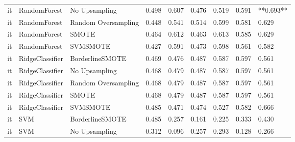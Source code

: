 \begin{tabular}{lllllllll}
      it &                 RandomForest &       No Upsampling & 0.498 &                     0.607 &                 0.476 &                  0.519 &                                   0.591 & **0.693** \\
      it &                 RandomForest & Random Oversampling & 0.448 &                     0.541 &                 0.514 &                  0.599 &                                   0.581 &     0.629 \\
      it &                 RandomForest &               SMOTE & 0.464 &                     0.612 &                 0.463 &                  0.613 &                                   0.585 &     0.629 \\
      it &                 RandomForest &            SVMSMOTE & 0.427 &                     0.591 &                 0.473 &                  0.598 &                                   0.561 &     0.582 \\
      it &              RidgeClassifier &     BorderlineSMOTE & 0.469 &                     0.476 &                 0.487 &                  0.587 &                                   0.597 &     0.561 \\
      it &              RidgeClassifier &       No Upsampling & 0.468 &                     0.479 &                 0.487 &                  0.587 &                                   0.597 &     0.561 \\
      it &              RidgeClassifier & Random Oversampling & 0.468 &                     0.479 &                 0.487 &                  0.587 &                                   0.597 &     0.561 \\
      it &              RidgeClassifier &               SMOTE & 0.468 &                     0.479 &                 0.487 &                  0.587 &                                   0.597 &     0.561 \\
      it &              RidgeClassifier &            SVMSMOTE & 0.485 &                     0.471 &                 0.474 &                  0.527 &                                   0.582 &     0.666 \\
      it &                          SVM &     BorderlineSMOTE & 0.485 &                     0.257 &                 0.161 &                  0.225 &                                   0.333 &     0.430 \\
      it &                          SVM &       No Upsampling & 0.312 &                     0.096 &                 0.257 &                  0.293 &                                   0.128 &     0.266 \\

\end{tabular}
